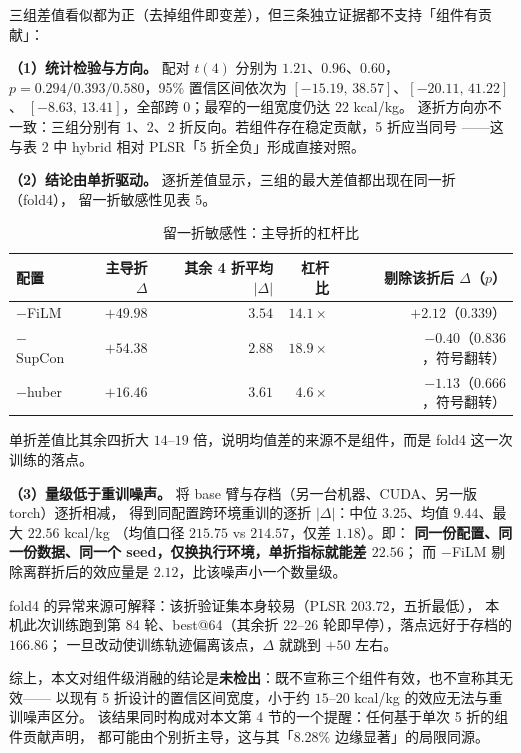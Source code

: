 \documentclass[11pt,a4paper,UTF8]{ctexart}
\begin{document}
三组差值看似都为正（去掉组件即变差），但三条独立证据都不支持「组件有贡献」：

\textbf{（1）统计检验与方向。} 配对 $t(4)$ 分别为 $1.21$、$0.96$、$0.60$，
$p=0.294/0.393/0.580$，95\% 置信区间依次为 $[-15.19,\,38.57]$、$[-20.11,\,41.22]$、
$[-8.63,\,13.41]$，全部跨 $0$；最窄的一组宽度仍达 $22$ kcal/kg。
逐折方向亦不一致：三组分别有 1、2、2 折反向。若组件存在稳定贡献，5 折应当同号
——这与表 2 中 hybrid 相对 PLSR「5 折全负」形成直接对照。

\textbf{（2）结论由单折驱动。} 逐折差值显示，三组的最大差值都出现在同一折（fold4），
留一折敏感性见表 5。

\begin{table}[htbp]
\centering\caption{留一折敏感性：主导折的杠杆比}
\begin{tabular}{lrrrr}
\toprule
配置 & 主导折 $\Delta$ & 其余 4 折平均 $|\Delta|$ & 杠杆比 & 剔除该折后 $\Delta$（$p$） \\
\midrule
$-$FiLM   & $+49.98$ & $3.54$ & $14.1\times$ & $+2.12$（$0.339$） \\
$-$SupCon & $+54.38$ & $2.88$ & $18.9\times$ & $-0.40$（$0.836$，符号翻转） \\
$-$huber  & $+16.46$ & $3.61$ & $4.6\times$  & $-1.13$（$0.666$，符号翻转） \\
\bottomrule
\end{tabular}
\end{table}

单折差值比其余四折大 $14$--$19$ 倍，说明均值差的来源不是组件，而是 fold4 这一次训练的落点。

\textbf{（3）量级低于重训噪声。} 将 base 臂与存档（另一台机器、CUDA、另一版 torch）逐折相减，
得到同配置跨环境重训的逐折 $|\Delta|$：中位 $3.25$、均值 $9.44$、最大 $22.56$ kcal/kg
（均值口径 $215.75$ vs $214.57$，仅差 $1.18$）。即：
\textbf{同一份配置、同一份数据、同一个 seed，仅换执行环境，单折指标就能差 $22.56$}；
而 $-$FiLM 剔除离群折后的效应量是 $2.12$，比该噪声小一个数量级。

fold4 的异常来源可解释：该折验证集本身较易（PLSR $203.72$，五折最低），
本机此次训练跑到第 84 轮、best@64（其余折 22--26 轮即早停），落点远好于存档的 $166.86$；
一旦改动使训练轨迹偏离该点，$\Delta$ 就跳到 $+50$ 左右。

综上，本文对组件级消融的结论是\textbf{未检出}：既不宣称三个组件有效，也不宣称其无效——
以现有 5 折设计的置信区间宽度，小于约 $15$--$20$ kcal/kg 的效应无法与重训噪声区分。
该结果同时构成对本文第 4 节的一个提醒：任何基于单次 5 折的组件贡献声明，
都可能由个别折主导，这与其「$8.28\%$ 边缘显著」的局限同源。
\end{document}
